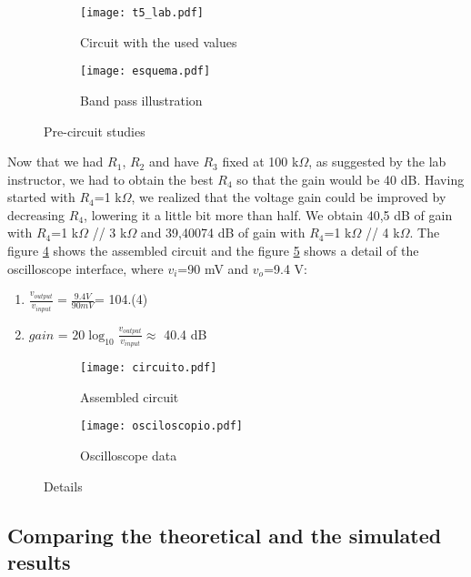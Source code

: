  
\begin{figure}[H]
\centering
\begin{subfigure}{0.5\textwidth}
  \centering
  \texttt{[image: t5\_lab.pdf]}
  \caption{Circuit with the used values}
  \label{fig_lab1}
\end{subfigure}%
\begin{subfigure}{.5\textwidth}
  \centering
  \texttt{[image: esquema.pdf]}
  \caption{Band pass illustration}
  \label{fig_lab2}
\end{subfigure}
\caption{Pre-circuit studies}
\label{fig_lab}
\end{figure}

Now that we had $R_1$, $R_2$ and have $R_3$ fixed at 100 k$\Omega$, as suggested by the lab instructor, we had to obtain the best $R_4$ so that the gain would be 40 dB. Having started with $R_4$=1 k$\Omega$, we realized that the voltage gain could be improved by decreasing $R_4$,  lowering it a little bit more than half. We obtain 40,5 dB of gain with $R_4$=1 k$\Omega$ // 3 k$\Omega$ and 39,40074 dB of gain with $R_4$=1 k$\Omega$ // 4 k$\Omega$. The figure \ref{fig_lab3} shows the assembled circuit and the figure \ref{fig_lab4} shows a detail of the oscilloscope interface, where $v_i$=90 mV and $v_o$=9.4 V:
\begin{enumerate}
    \item $\frac{v_{output}}{v_{input}}=\frac{9.4 V}{90 mV}$= 104.(4)
    \item $gain$ = $20 \log_{10} \frac{v_{output}}{v_{input}} \approx$ 40.4 dB
\end{enumerate}

\begin{figure}[H]
\centering
\begin{subfigure}{0.5\textwidth}
  \centering
  \texttt{[image: circuito.pdf]}
  \caption{Assembled circuit}
  \label{fig_lab3}
\end{subfigure}%
\begin{subfigure}{.5\textwidth}
  \centering
  \texttt{[image: osciloscopio.pdf]}
  \caption{Oscilloscope data}
  \label{fig_lab4}
\end{subfigure}
\caption{Details}
\label{fig_lab}
\end{figure}

\subsection{Comparing the theoretical and the simulated results}

